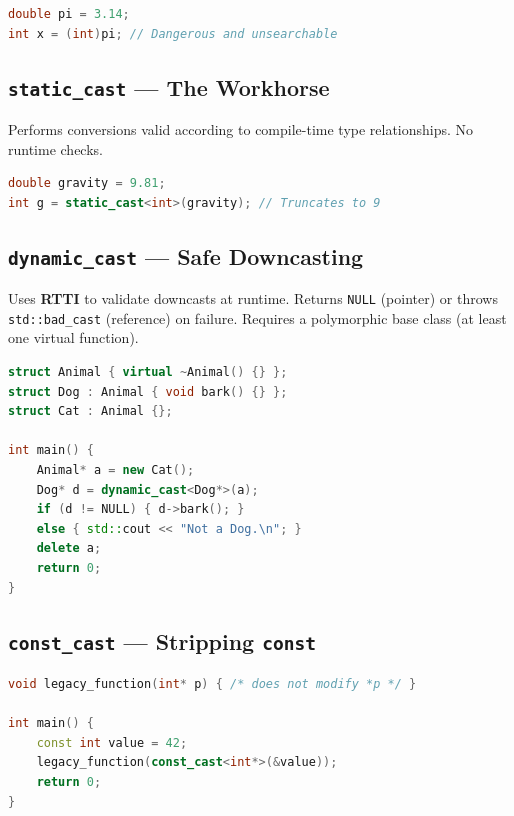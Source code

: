 \begin{lstlisting}[language=C++, caption={C-style cast (never use in new code)}]
double pi = 3.14;
int x = (int)pi; // Dangerous and unsearchable
\end{lstlisting}

\subsection{\texttt{static\_cast} --- The Workhorse}

Performs conversions valid according to compile-time type relationships. No runtime checks.

\begin{lstlisting}[language=C++, caption={static\_cast for numeric conversion}]
double gravity = 9.81;
int g = static_cast<int>(gravity); // Truncates to 9
\end{lstlisting}

\subsection{\texttt{dynamic\_cast} --- Safe Downcasting}

Uses \textbf{RTTI} to validate downcasts at runtime. Returns \texttt{NULL} (pointer) or throws \texttt{std::bad\_cast} (reference) on failure. Requires a polymorphic base class (at least one virtual function).

\begin{lstlisting}[language=C++, caption={dynamic\_cast with null check}]
struct Animal { virtual ~Animal() {} };
struct Dog : Animal { void bark() {} };
struct Cat : Animal {};

int main() {
    Animal* a = new Cat();
    Dog* d = dynamic_cast<Dog*>(a);
    if (d != NULL) { d->bark(); }
    else { std::cout << "Not a Dog.\n"; }
    delete a;
    return 0;
}
\end{lstlisting}

\subsection{\texttt{const\_cast} --- Stripping \texttt{const}}

\begin{lstlisting}[language=C++, caption={const\_cast for legacy API compatibility}]
void legacy_function(int* p) { /* does not modify *p */ }

int main() {
    const int value = 42;
    legacy_function(const_cast<int*>(&value));
    return 0;
}
\end{lstlisting}

